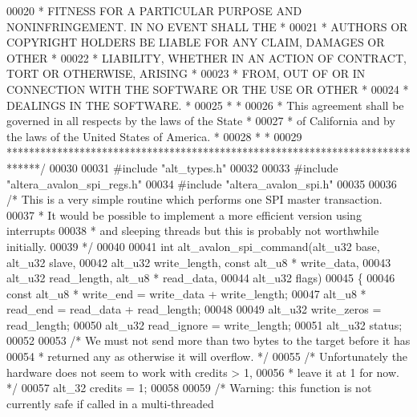 \begin{DoxyCode}
00020 \textcolor{comment}{* FITNESS FOR A PARTICULAR PURPOSE AND NONINFRINGEMENT. IN NO EVENT SHALL THE *}
00021 \textcolor{comment}{* AUTHORS OR COPYRIGHT HOLDERS BE LIABLE FOR ANY CLAIM, DAMAGES OR OTHER      *}
00022 \textcolor{comment}{* LIABILITY, WHETHER IN AN ACTION OF CONTRACT, TORT OR OTHERWISE, ARISING     *}
00023 \textcolor{comment}{* FROM, OUT OF OR IN CONNECTION WITH THE SOFTWARE OR THE USE OR OTHER         *}
00024 \textcolor{comment}{* DEALINGS IN THE SOFTWARE.                                                   *}
00025 \textcolor{comment}{*                                                                             *}
00026 \textcolor{comment}{* This agreement shall be governed in all respects by the laws of the State   *}
00027 \textcolor{comment}{* of California and by the laws of the United States of America.              *}
00028 \textcolor{comment}{*                                                                             *}
00029 \textcolor{comment}{******************************************************************************/}
00030 
00031 \textcolor{preprocessor}{#include "alt_types.h"}
00032 
00033 \textcolor{preprocessor}{#include "altera_avalon_spi_regs.h"}
00034 \textcolor{preprocessor}{#include "altera_avalon_spi.h"}
00035 
00036 \textcolor{comment}{/* This is a very simple routine which performs one SPI master transaction.}
00037 \textcolor{comment}{ * It would be possible to implement a more efficient version using interrupts}
00038 \textcolor{comment}{ * and sleeping threads but this is probably not worthwhile initially.}
00039 \textcolor{comment}{ */}
00040 
00041 \textcolor{keywordtype}{int} alt_avalon_spi_command(alt_u32 base, alt_u32 slave,
00042                            alt_u32 write\_length, \textcolor{keyword}{const} alt_u8 * write\_data,
00043                            alt_u32 read\_length, alt_u8 * read\_data,
00044                            alt_u32 flags)
00045 \{
00046   \textcolor{keyword}{const} alt_u8 * write\_end = write\_data + write\_length;
00047   alt_u8 * read\_end = read\_data + read\_length;
00048 
00049   alt_u32 write\_zeros = read\_length;
00050   alt_u32 read\_ignore = write\_length;
00051   alt_u32 status;
00052 
00053   \textcolor{comment}{/* We must not send more than two bytes to the target before it has}
00054 \textcolor{comment}{   * returned any as otherwise it will overflow. */}
00055   \textcolor{comment}{/* Unfortunately the hardware does not seem to work with credits > 1,}
00056 \textcolor{comment}{   * leave it at 1 for now. */}
00057   alt_32 credits = 1;
00058 
00059   \textcolor{comment}{/* Warning: this function is not currently safe if called in a multi-threaded}

\end{DoxyCode}
